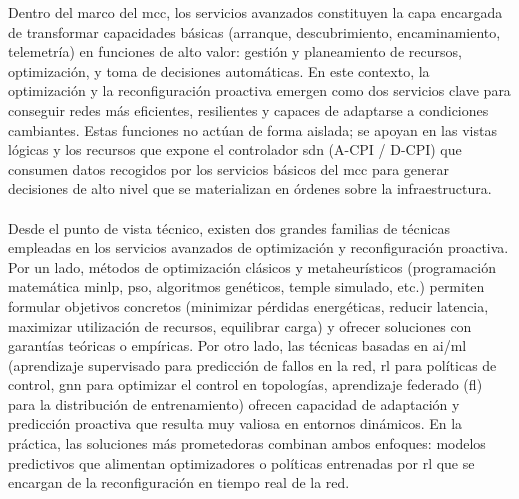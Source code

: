 
Dentro del marco del \gls{mcc}, los servicios avanzados constituyen la capa encargada de transformar capacidades básicas (arranque, descubrimiento, encaminamiento, telemetría) en funciones de alto valor: gestión y planeamiento de recursos, optimización, y toma de decisiones automáticas. En este contexto, la optimización y la reconfiguración proactiva emergen como dos servicios clave para conseguir redes más eficientes, resilientes y capaces de adaptarse a condiciones cambiantes. Estas funciones no actúan de forma aislada; se apoyan en las vistas lógicas y los recursos que expone el controlador \gls{sdn} (A-CPI / D-CPI) que consumen datos recogidos por los servicios básicos del \gls{mcc} para generar decisiones de alto nivel que se materializan en órdenes sobre la infraestructura.\\
\\
Desde el punto de vista técnico, existen dos grandes familias de técnicas empleadas en los servicios avanzados de optimización y reconfiguración proactiva. Por un lado, métodos de optimización clásicos y metaheurísticos (programación matemática \gls{minlp},  \gls{pso}, algoritmos genéticos, temple simulado, etc.) permiten formular objetivos concretos (minimizar pérdidas energéticas, reducir latencia, maximizar utilización de recursos, equilibrar carga) y ofrecer soluciones con garantías teóricas o empíricas. Por otro lado, las técnicas basadas en \gls{ai}/\gls{ml} (aprendizaje supervisado para predicción de fallos en la red, \gls{rl} para políticas de control, \gls{gnn} para optimizar el control en topologías, aprendizaje federado (\gls{fl}) para la distribución de entrenamiento) ofrecen capacidad de adaptación y predicción proactiva que resulta muy valiosa en entornos dinámicos. En la práctica, las soluciones más prometedoras combinan ambos enfoques: modelos predictivos que alimentan optimizadores o políticas entrenadas por \gls{rl} que se encargan de la reconfiguración en tiempo real de la red.\\
\\
